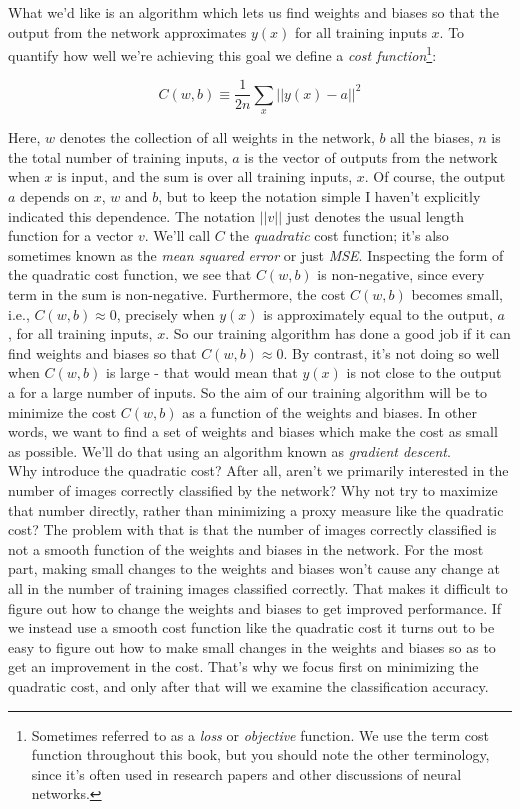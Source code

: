 What we'd like is an algorithm which lets us find weights and biases so that the output from the network approximates $y(x)$ for all training inputs $x$. To quantify how well we're achieving this goal we define a \textit{cost function}\footnote{Sometimes referred to as a \textit{loss} or \textit{objective} function. We use the term cost function throughout this book, but you should note the other terminology, since it's often used in research papers and other discussions of neural networks.}:

\begin{equation}
C(w, b) \equiv \frac{1}{2n}\sum_x\left|\left|y(x)-a\right|\right|^2
\label{eq: cost function}
\end{equation}

Here, $w$ denotes the collection of all weights in the network, $b$ all the biases, $n$ is the total number of training inputs, $a$ is the vector of outputs from the network when $x$ is input, and the sum is over all training inputs, $x$. Of course, the output $a$ depends on $x$, $w$ and $b$, but to keep the notation simple I haven't explicitly indicated this dependence. The notation $||v||$ just denotes the usual length function for a vector $v$. We'll call $C$ the \textit{quadratic} cost function; it's also sometimes known as the \textit{mean squared error} or just \textit{MSE}. Inspecting the form of the quadratic cost function, we see that $C(w,b)$ is non-negative, since every term in the sum is non-negative. Furthermore, the cost $C(w,b)$ becomes small, i.e., $C(w,b)\approx0$, precisely when $y(x)$ is approximately equal to the output, $a$
, for all training inputs, $x$. So our training algorithm has done a good job if it can find weights and biases so that $C(w,b)\approx0$. By contrast, it's not doing so well when $C(w,b)$ is large - that would mean that $y(x)$ is not close to the output a
 for a large number of inputs. So the aim of our training algorithm will be to minimize the cost $C(w,b)$ as a function of the weights and biases. In other words, we want to find a set of weights and biases which make the cost as small as possible. We'll do that using an algorithm known as \textit{gradient descent}.\\

Why introduce the quadratic cost? After all, aren't we primarily interested in the number of images correctly classified by the network? Why not try to maximize that number directly, rather than minimizing a proxy measure like the quadratic cost? The problem with that is that the number of images correctly classified is not a smooth function of the weights and biases in the network. For the most part, making small changes to the weights and biases won't cause any change at all in the number of training images classified correctly. That makes it difficult to figure out how to change the weights and biases to get improved performance. If we instead use a smooth cost function like the quadratic cost it turns out to be easy to figure out how to make small changes in the weights and biases so as to get an improvement in the cost. That's why we focus first on minimizing the quadratic cost, and only after that will we examine the classification accuracy.\\

